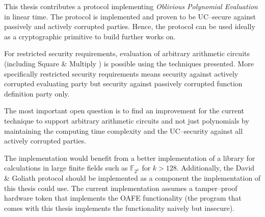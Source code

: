 
This thesis contributes a protocol implementing \emph{Oblivious Polynomial
Evaluation} in linear time. The protocol is implemented and proven to be
UC--secure \cite{canetti05} against passively and actively corrupted parties.
Hence, the protocol can be used ideally as a cryptographic primitive to build
further works on.

For restricted security requirements, evaluation of arbitrary arithmetic
circuits (including Square \& Multiply \cite{knuth81}) is possible using the
techniques presented. More specifically restricted security requirements means
security against actively corrupted evaluating party but security against
passively corrupted function definition party only.


%
%
\label{sec:outlook}

The most important open question is to find an improvement for the current
technique to support arbitrary arithmetic circuits and not just polynomials by
maintaining the computing time complexity and the UC--security against all
actively corrupted parties.

The implementation would benefit from a better implementation of a library for
calculations in large finite fields such as $\mathbb{F}_{2^{k}}$ for $k > 128$.
Additionally, the David \& Goliath protocol \cite{davidgoliath} should be
implemented as a component the implementation of this thesis could use. The
current implementation assumes a tamper--proof hardware token that implements
the OAFE functionality (the program \JWBtoken{} that comes with this thesis
implements the functionality naively but insecure).

